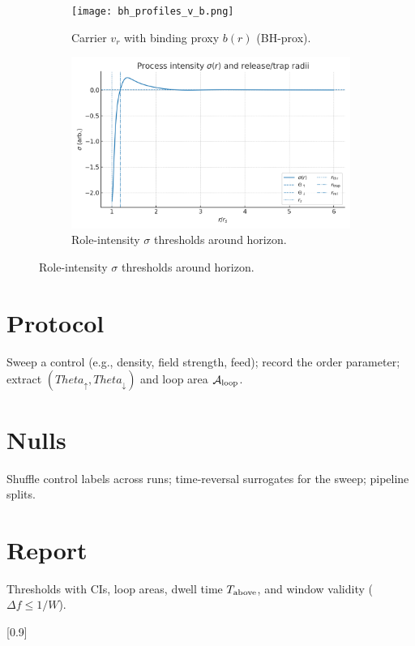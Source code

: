 \documentclass[12pt,a4paper,oneside]{scrreprt}
\def\Theta{Theta}%
\begin{document}
\begin{figure}[htbp]\centering
  \begin{subfigure}[t]{0.49\linewidth}
    \texttt{[image: bh\_profiles\_v\_b.png]}
    \caption{Carrier $v_r$ with binding proxy $b(r)$ (BH-prox).}
    \label{fig:bh:profiles}
  \end{subfigure}\hfill
  \begin{subfigure}[t]{0.49\linewidth}
    \includegraphics[width=\linewidth]{bh_sigma_thresholds.png}
    \caption{Role-intensity $\sigma$ thresholds around horizon.}
    \label{fig:bh:sigma}
  \end{subfigure}
\end{figure}

\section*{Protocol}
Sweep a control (e.g., density, field strength, feed); record the order parameter; extract $(\Theta_\uparrow,\Theta_\downarrow)$ and loop area $\mathcal A_{\rm loop}$.

\section*{Nulls}
Shuffle control labels across runs; time-reversal surrogates for the sweep; pipeline splits.

\section*{Report}
Thresholds with CIs, loop areas, dwell time $T_{\rm above}$, and window validity ($\Delta f\le 1/W$).

[0.9]
\end{document}
